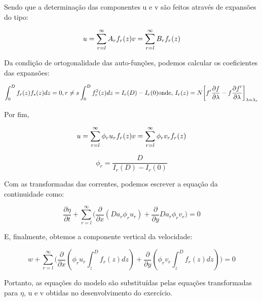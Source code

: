 \documentclass[11pt]{article}
\begin{document}
Sendo que a determinação das componentes u e v são feitos através de
expansões do tipo:

\begin{equation}
    u = \sum^{\infty}_{r=l} A_rf_r(z)
    \\
    v = \sum^{\infty}_{r=l} B_rf_r(z)
    \label{eq:4.12}
\end{equation}

Da condição de ortogonalidade das auto-funções, podemos calcular os
coeficientes das expansões:

\begin{equation}
    \int^{D}_{0}f_r(z) f_s(z) dz = 0, r \neq s
    \\
    \int^{D}_{0}f^{2}_{r}(z) dz = I_r(D) - I_r(0)
    \\
    \text{onde, } I_r(z) = N\bigg[ f'\frac{\partial{f}}{\partial{\lambda}} - f\frac{\partial{f'}}{\partial{\lambda}} \bigg]_{\lambda=\lambda_r}
    \label{eq:4.13}
\end{equation}

Por fim,

\begin{equation}
    u = \sum^{\infty}_{r=l} \phi_r u_r f_r(z)
    \\
    v = \sum^{\infty}_{r=l} \phi_r v_r f_r(z)
    \label{eq:4.14}
\end{equation}

\begin{equation}
    \phi_r = \frac{D}{I_r(D) - I_r(0)}
    \label{eq:4.15}
\end{equation}

Com as transformadas das correntes, podemos escrever a equação da
continuidade como:

\begin{equation}
    \frac{\partial{\eta}}{\partial{t}} + \sum^{\infty}_{r=l}\bigg( \frac{\partial}{\partial{x}}(D a_r \phi_r u_r) + \frac{\partial}{\partial{y}}D a_r \phi_r v_r \bigg) = 0
\end{equation}

E, finalmente, obtemos a componente vertical da velocidade:

\begin{equation}
    w + \sum^{\infty}_{r=l}\bigg( \frac{\partial}{\partial{x}}(\phi_r u_r\int^{D}_{z}f_r(z)dz) + \frac{\partial}{\partial{y}}(\phi_r v_r\int^{D}_{z}f_r(z)dz) \bigg) = 0
\end{equation}

Portanto, as equações do modelo são substituídas pelas equações
transformadas para \(\eta\), u e v obtidas no desenvolvimento do
exercício.
\end{document}
